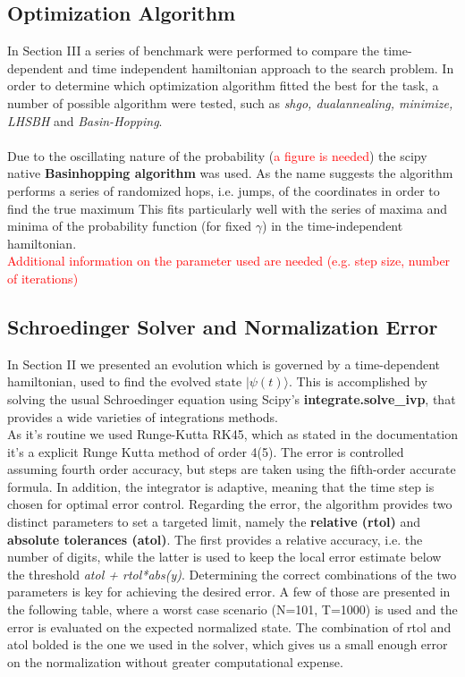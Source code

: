 \documentclass[aps,pra,reprint, onecolumn]{revtex4-2}
\newcommand{\red}[1]{\textcolor{red}{#1}}
\begin{document}
\subsection{Optimization Algorithm}
In Section III a series of benchmark were performed to compare the time-dependent and time independent hamiltonian approach to the search problem. In order to determine which optimization algorithm fitted the best for the task, a number of possible algorithm were tested, such as \textit{shgo, dualannealing, minimize, LHSBH} and \textit{Basin-Hopping}.\\ \\
Due to the oscillating nature of the probability (\red{a figure is needed}) the scipy native \textbf{Basinhopping algorithm} was used. As the name suggests the algorithm performs a series of randomized hops, i.e. jumps, of the coordinates in order to find the true maximum This fits particularly well with the series of maxima and minima of the probability function (for fixed $\gamma$) in the time-independent hamiltonian. \\\red{Additional information on the parameter used are needed (e.g. step size, number of iterations)} 

\subsection{Schroedinger Solver and Normalization Error}
In Section II we presented an evolution which is governed by a time-dependent hamiltonian, used to find the evolved state $|\psi(t)\rangle$. This is accomplished by solving the usual Schroedinger equation using Scipy's \textbf{integrate.solve\_ivp}, that provides a wide varieties of integrations methods. \\

As it's routine we used Runge-Kutta RK45, which as stated in the documentation it's a explicit Runge Kutta method of order 4(5). The error is controlled assuming fourth order accuracy, but steps are taken using the fifth-order accurate formula. In addition, the integrator is adaptive, meaning that the time step is chosen for optimal error control. Regarding the error, the algorithm provides two distinct parameters to set a targeted limit, namely the \textbf{relative (rtol)} and \textbf{absolute tolerances (atol)}. The first provides a relative accuracy, i.e. the number of digits, while the latter is used to keep the local error estimate below the threshold \textit{atol + rtol*abs(y)}. Determining the correct combinations of the two parameters is key for achieving the desired error. A few of those are presented in the following table, where a worst case scenario (N=101, T=1000) is used and the error is evaluated on the expected normalized state. The combination of rtol and atol bolded is the one we used in the solver, which gives us a small enough error on the normalization without greater computational expense.\\
\end{document}
